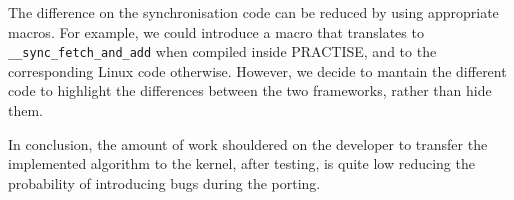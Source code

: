 The difference on the synchronisation code can be reduced by using appropriate macros.
For example, we could introduce a macro that translates to \texttt{\_\_sync\_fetch\_and\_add}
when compiled inside PRACTISE, and to the corresponding Linux code otherwise. However,
we decide to mantain the different code to highlight the differences between the two 
frameworks, rather than hide them.

In conclusion, the amount of work shouldered on the developer to transfer the implemented
algorithm to the kernel, after testing, is quite low reducing the probability of introducing
bugs during the porting.
